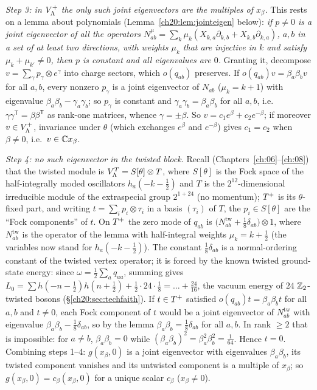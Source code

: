 \emph{Step 3: in $V_{\Lambda}^{+}$ the only such joint eigenvectors are the multiples of $x_\beta$.}  This rests on a
lemma about polynomials (Lemma~\ref{ch20:lem:jointeigen} below): \emph{if $p\neq0$ is a joint eigenvector of all the
operators $N^\mu_{ab}=\sum_k\mu_k(X_{k,a}\partial_{k,b}+X_{k,b}\partial_{k,a})$, $a,b$ in a set of at least two
directions, with weights $\mu_k$ that are injective in $k$ and satisfy $\mu_k+\mu_{k'}\neq0$, then $p$ is constant and
all eigenvalues are $0$.}  Granting it, decompose $v=\sum_\gamma p_\gamma\otimes e^\gamma$ into charge sectors, which
$o(q_{ab})$ preserves.  If $o(q_{ab})v=\beta_a\beta_bv$ for all $a,b$, every nonzero $p_\gamma$ is a joint eigenvector
of $N_{ab}$ ($\mu_k=k+1$) with eigenvalue $\beta_a\beta_b-\gamma_a\gamma_b$; so $p_\gamma$ is constant and
$\gamma_a\gamma_b=\beta_a\beta_b$ for all $a,b$, i.e.\ $\gamma\gamma^{\mathsf T}=\beta\beta^{\mathsf T}$ as rank-one
matrices, whence $\gamma=\pm\beta$.  So $v=c_1e^\beta+c_2e^{-\beta}$; if moreover $v\in V_{\Lambda}^{+}$, invariance under
$\theta$ (which exchanges $e^\beta$ and $e^{-\beta}$) gives $c_1=c_2$ when $\beta\ne0$, i.e.\ $v\in{\mathbb{C}} x_\beta$.

\emph{Step 4: no such eigenvector in the twisted block.}  Recall (Chapters~\ref{ch:06}--\ref{ch:08}) that the twisted module is
$V_{\Lambda}^T=S[\theta]\otimes T$, where $S[\theta]$ is the Fock space of the half-integrally moded oscillators $h_a(-k-\tfrac12)$
and $T$ is the $2^{12}$-dimensional irreducible module of the extraspecial group $2^{1+24}$ (no momentum); $T^{+}$ is its
$\theta$-fixed part, and writing $t=\sum_ip_i\otimes\tau_i$ in a basis $(\tau_i)$ of $T$, the $p_i\in S[\theta]$ are the ``Fock
components'' of $t$.  On $T^{+}$ the zero mode of
$q_{ab}$ is $\bigl(N^{\mathrm{tw}}_{ab}+\tfrac18\delta_{ab}\bigr)\otimes1$, where $N^{\mathrm{tw}}_{ab}$ is the operator
of the lemma with half-integral weights $\mu_k=k+\tfrac12$ (the variables now stand for $h_a(-k-\tfrac12)$).  The
constant $\tfrac18\delta_{ab}$ is a normal-ordering constant of the twisted vertex operator; it is forced by the known
twisted ground-state energy: since $\omega=\tfrac12\sum_aq_{aa}$, summing gives $L_0=\sum h(-n-\tfrac12)h(n+\tfrac12)+\tfrac12\cdot24\cdot\tfrac18
=\dots+\tfrac{24}{16}$, the vacuum energy of $24$ ${\mathbb{Z}}_2$-twisted bosons (\S\ref{ch20:sec:techfaith}).  If $t\in T^{+}$ satisfied $o(q_{ab})t=\beta_a\beta_bt$ for all $a,b$ and $t\neq0$,
each Fock component of $t$ would be a joint eigenvector of $N^{\mathrm{tw}}_{ab}$ with eigenvalue
$\beta_a\beta_b-\tfrac18\delta_{ab}$, so by the lemma $\beta_a\beta_b=\tfrac18\delta_{ab}$ for all $a,b$.  In rank
$\ge2$ that is impossible: for $a\ne b$, $\beta_a\beta_b=0$ while $(\beta_a\beta_b)^2=\beta_a^2\beta_b^2=\tfrac1{64}$.
Hence $t=0$.  Combining steps 1--4: $g(x_\beta,0)$ is a joint eigenvector with eigenvalues $\beta_a\beta_b$, its
twisted component vanishes and its untwisted component is a multiple of $x_\beta$; so $g(x_\beta,0)=c_\beta(x_\beta,0)$
for a unique scalar $c_\beta$ ($x_\beta\neq0$).

